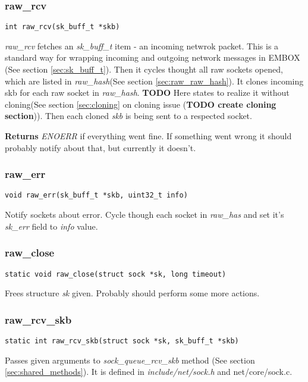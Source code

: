 \documentclass[12pt,a4paper]{article}
\begin{document}
\subsubsection{raw\_rcv}
\label{sec:raw_sock_raw_rcv}
\begin{verbatim}
int raw_rcv(sk_buff_t *skb)
\end{verbatim}

{\it raw\_rcv} fetches an {\it sk\_buff\_t} item - an incoming netwrok packet.
This is a standard way for wrapping incoming and outgoing network messages in
EMBOX (See section \ref{sec:sk_buff_t}). Then it cycles thought all raw sockets
opened, which are listed in {\it raw\_hash}(See section \ref{sec:raw_raw_hash}).
It clones incoming skb for each raw socket in {\it raw\_hash}. {\bf TODO}
Here states to realize it without cloning(See section \ref{sec:cloning} on
cloning issue ({\bf TODO create cloning section})).
Then each cloned {\it skb} is being sent to a respected socket.

{\bf Returns} {\it ENOERR} if everything went fine. If something went wrong it
should probably notify about that, but currently it doesn't.

\subsubsection{raw\_err}
\label{sec:raw_sock_raw_err}
\begin{verbatim}
void raw_err(sk_buff_t *skb, uint32_t info)
\end{verbatim}
Notify sockets about error. Cycle though each socket in {\it raw\_has} and set
it's {\it sk\_err} field to {\it info} value.

\subsubsection{raw\_close}
\label{sec:raw_sock_raw_close}
\label{sec:raw_sock_}
\begin{verbatim}
static void raw_close(struct sock *sk, long timeout)
\end{verbatim}
Frees structure {\it sk} given. Probably should perform some more actions.

\subsubsection{raw\_rcv\_skb}
\label{sec:raw_sock_raw_rcv_skb}
\begin{verbatim}
static int raw_rcv_skb(struct sock *sk, sk_buff_t *skb)
\end{verbatim}
Passes given arguments to {\it sock\_queue\_rcv\_skb} method (See section 
{\ref{sec:shared_methods}}). It is defined in {\it include/net/sock.h} and
{net/core/sock.c}.
\end{document}
